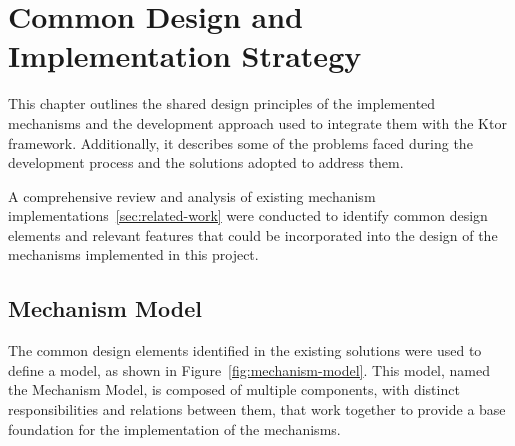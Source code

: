 \chapter{Common Design and Implementation Strategy}\label{ch:design-implementation}

This chapter outlines the shared design principles of the implemented mechanisms and the development approach
used to integrate them with the Ktor framework.
Additionally, it describes some of the problems faced during the development process and the solutions adopted to address them.

A comprehensive review and analysis of existing mechanism implementations~\ref{sec:related-work} were conducted
to identify common design elements and relevant features that could be incorporated into the design of the mechanisms implemented in this project.


\section{Mechanism Model}\label{sec:mechanism-model}

The common design elements identified in the existing solutions were used
to define a model, as shown in Figure~\ref{fig:mechanism-model}.
This model, named the Mechanism Model, is composed of multiple components, with distinct responsibilities and relations between them, that work together to provide a base foundation for the implementation of the mechanisms.

